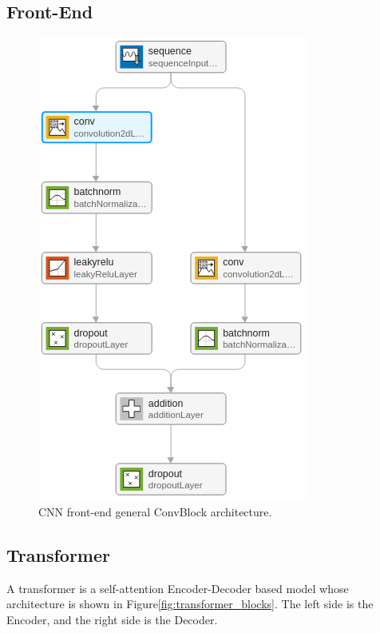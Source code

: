
\subsection{Front-End}
\begin{figure}[H]
    \centering
    \includegraphics[width=0.45\linewidth]{ASR/images/single_convblock}
    \caption{CNN front-end general ConvBlock architecture.}\label{fig:transformer_cnn_convblock}
\end{figure}

\subsection{Transformer}
A transformer is a self-attention Encoder-Decoder
based model whose architecture is
shown in Figure\;\ref{fig:transformer_blocks}.
The left side is the Encoder, and the right
side is the Decoder.

